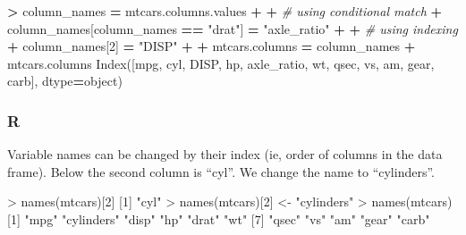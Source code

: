 \documentclass[
]{book}
\newenvironment{Shaded}{\begin{snugshade}}{\end{snugshade}}
\newcommand{\CommentTok}[1]{\textcolor[rgb]{0.56,0.35,0.01}{\textit{#1}}}
\newcommand{\DecValTok}[1]{\textcolor[rgb]{0.00,0.00,0.81}{#1}}
\newcommand{\FunctionTok}[1]{\textcolor[rgb]{0.00,0.00,0.00}{#1}}
\newcommand{\NormalTok}[1]{#1}
\newcommand{\OperatorTok}[1]{\textcolor[rgb]{0.81,0.36,0.00}{\textbf{#1}}}
\newcommand{\OtherTok}[1]{\textcolor[rgb]{0.56,0.35,0.01}{#1}}
\newcommand{\SpecialCharTok}[1]{\textcolor[rgb]{0.00,0.00,0.00}{#1}}
\newcommand{\StringTok}[1]{\textcolor[rgb]{0.31,0.60,0.02}{#1}}
\begin{document}
\begin{Shaded}
\begin{Highlighting}[]
\OperatorTok{\textgreater{}}\NormalTok{ column\_names }\OperatorTok{=}\NormalTok{ mtcars.columns.values}
\OperatorTok{+} 
\OperatorTok{+} \CommentTok{\# using conditional match}
\OperatorTok{+}\NormalTok{ column\_names[column\_names }\OperatorTok{==} \StringTok{"drat"}\NormalTok{] }\OperatorTok{=} \StringTok{"axle\_ratio"}
\OperatorTok{+} 
\OperatorTok{+} \CommentTok{\# using indexing}
\OperatorTok{+}\NormalTok{ column\_names[}\DecValTok{2}\NormalTok{] }\OperatorTok{=} \StringTok{"DISP"}
\OperatorTok{+} 
\OperatorTok{+}\NormalTok{ mtcars.columns }\OperatorTok{=}\NormalTok{ column\_names}
\OperatorTok{+}\NormalTok{ mtcars.columns}
\NormalTok{Index([}\StringTok{\textquotesingle{}mpg\textquotesingle{}}\NormalTok{, }\StringTok{\textquotesingle{}cyl\textquotesingle{}}\NormalTok{, }\StringTok{\textquotesingle{}DISP\textquotesingle{}}\NormalTok{, }\StringTok{\textquotesingle{}hp\textquotesingle{}}\NormalTok{, }\StringTok{\textquotesingle{}axle\_ratio\textquotesingle{}}\NormalTok{, }\StringTok{\textquotesingle{}wt\textquotesingle{}}\NormalTok{, }\StringTok{\textquotesingle{}qsec\textquotesingle{}}\NormalTok{, }\StringTok{\textquotesingle{}vs\textquotesingle{}}\NormalTok{, }\StringTok{\textquotesingle{}am\textquotesingle{}}\NormalTok{,}
       \StringTok{\textquotesingle{}gear\textquotesingle{}}\NormalTok{, }\StringTok{\textquotesingle{}carb\textquotesingle{}}\NormalTok{],}
\NormalTok{      dtype}\OperatorTok{=}\StringTok{\textquotesingle{}object\textquotesingle{}}\NormalTok{)}
\end{Highlighting}
\end{Shaded}

\hypertarget{r-20}{%
\subsubsection*{R}\label{r-20}}

Variable names can be changed by their index (ie, order of columns in the data frame). Below the second column is ``cyl''. We change the name to ``cylinders''.

\begin{Shaded}
\begin{Highlighting}[]
\SpecialCharTok{\textgreater{}} \FunctionTok{names}\NormalTok{(mtcars)[}\DecValTok{2}\NormalTok{]}
\NormalTok{[}\DecValTok{1}\NormalTok{] }\StringTok{"cyl"}
\SpecialCharTok{\textgreater{}} \FunctionTok{names}\NormalTok{(mtcars)[}\DecValTok{2}\NormalTok{] }\OtherTok{\textless{}{-}} \StringTok{"cylinders"}
\SpecialCharTok{\textgreater{}} \FunctionTok{names}\NormalTok{(mtcars)}
\NormalTok{ [}\DecValTok{1}\NormalTok{] }\StringTok{"mpg"}       \StringTok{"cylinders"} \StringTok{"disp"}      \StringTok{"hp"}        \StringTok{"drat"}      \StringTok{"wt"}       
\NormalTok{ [}\DecValTok{7}\NormalTok{] }\StringTok{"qsec"}      \StringTok{"vs"}        \StringTok{"am"}        \StringTok{"gear"}      \StringTok{"carb"}     
\end{Highlighting}
\end{Shaded}
\end{document}
